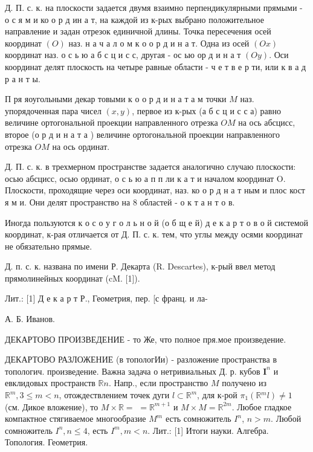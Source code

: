 \documentclass[10pt]{article}
\begin{document}
Д. П. с. к. на плоскости задается двумя взаимно перпендикулярными прямыми - о с я м и ко о р д ин а т, на каждой из к-рых выбрано положительное направление и задан отрезок единичной длины. Точка пересечения осей координат $(O)$ наз. н а ч а л о м к о о р д и н а т. Одна из осей $(O x)$ координат наз. о с ь ю а б с ц и с с, другая - ос ью ор д и н а т $(O y)$. Оси координат делят плоскость на четыре равные области - ч е т в е р ти, или к в а д р а н т ы.



П ря яоугольными декар товыми к о о р д и н а т а м точки $M$ наз. упорядоченная пара чисел $(x, y)$, первое из к-рых (а б с ц и с с а) равно величине ортогональной проекции направленного отрезка $O M$ на ось абсцисс, второе (о р д и н а т а ) величине ортогональной проекции направленного отрезка $O M$ на ось ординат.



Д. П. с. к. в трехмерном пространстве задается аналогично случаю плоскости: осью абсцисс, осью ординат, о с ь ю а п п ли к а т и началом координат O. Плоскости, проходящие через оси координат, наз. ко о р д н а т ным и плос кост я м и. Они делят пространство на 8 областей - о к т а н т о в.



Иногда пользуются к о с о у г о л ь н о й (о б щ е й) д е к а р т о в о й системой координат, к-рая отличается от Д. П. с. к. тем, что углы между осями координат не обязательно прямые.



Д. п. с. к. названа по имени Р. Декарта (R. Descartes), к-рый ввел метод прямолинейных координат (cM. [1]).



Лит.: [1] Д е к а р т Р., Геометрия, пер. [с франц. и ла-

А. Б. Иванов.



ДЕКАРТОВО ПРОИЗВЕДЕНИЕ - то Же, что полное пря.мое произведение.



ДЕКАРТОВО РАЗЛОЖЕНИЕ (в топологИи) - разложение пространства в топологич. произведение. Важна задача о нетривиальных Д. р. кубов $\boldsymbol{I}^{n}$ и евклидовых пространств $\mathbb{R} n$. Напр., если пространство $M$ получено из $\mathbb{R}^{m}, 3 \leqslant m<n$, отождествлением точек дуги $l \subset \mathbb{R}^{m}$, для к-рой $\pi_{1}\left(\mathbb{R}{ }^{m} l\right) \neq 1$ (см. Дикое вложение), то $M \times \mathbb{R}=$ $=\mathbb{R}^{m+1}$ и $M \times M=\mathbb{R}^{2 m}$. Любое гладкое компактное стягиваемое многообразие $M^{m}$ есть сомножитель $I^{n}$, $n>m$. Любой сомножитель $I^{n}, n \leqslant 4$, есть $I^{m}, m<n$. Лит.: [1] Итоги науки. Алгебра. Топология. Геометрия.
\end{document}
